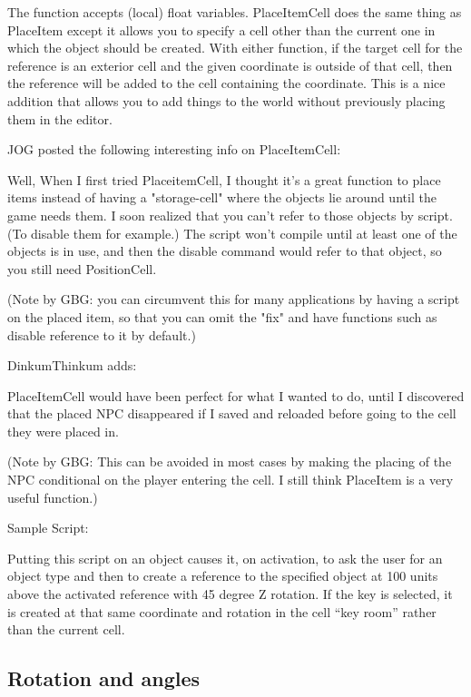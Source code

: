 The function accepts (local) float variables. PlaceItemCell does the
same thing as PlaceItem except it allows you to specify a cell other
than the current one in which the object should be created. With either
function, if the target cell for the reference is an exterior cell and
the given coordinate is outside of that cell, then the reference will be
added to the cell containing the coordinate. This is a nice addition
that allows you to add things to the world without previously placing
them in the editor.

JOG posted the following interesting info on PlaceItemCell:

Well, When I first tried PlaceitemCell, I thought it's a great function
to place items instead of having a "storage-cell" where the objects lie
around until the game needs them. I soon realized that you can't refer
to those objects by script. (To disable them for example.) The script
won't compile until at least one of the objects is in use, and then the
disable command would refer to that object, so you still need
PositionCell.

(Note by GBG: you can circumvent this for many applications by having a
script on the placed item, so that you can omit the "fix" and have
functions such as disable reference to it by default.)

DinkumThinkum adds:

PlaceItemCell would have been perfect for what I wanted to do, until I
discovered that the placed NPC disappeared if I saved and reloaded
before going to the cell they were placed in.

(Note by GBG: This can be avoided in most cases by making the placing of
the NPC conditional on the player entering the cell. I still think
PlaceItem is a very useful function.)

Sample Script:

Putting this script on an object causes it, on activation, to ask the
user for an object type and then to create a reference to the specified
object at 100 units above the activated reference with 45 degree Z
rotation. If the key is selected, it is created at that same coordinate
and rotation in the cell ``key room'' rather than the current cell.



\hypertarget{rotation-and-angles}{%
\subsection{\texorpdfstring{Rotation and angles
}{Rotation and angles }}\label{rotation-and-angles}}

